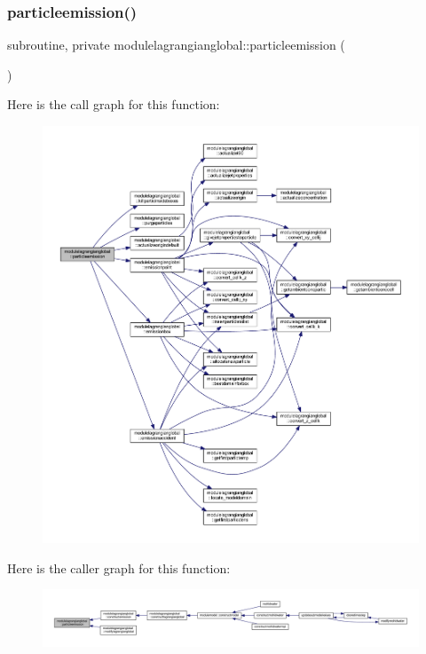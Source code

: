 \subsubsection{\texorpdfstring{particleemission()}{particleemission()}}
{\footnotesize\ttfamily subroutine, private modulelagrangianglobal\+::particleemission (\begin{DoxyParamCaption}{ }\end{DoxyParamCaption})\hspace{0.3cm}{\ttfamily [private]}}

Here is the call graph for this function\+:\nopagebreak
\begin{figure}[H]
\begin{center}
\leavevmode
\includegraphics[width=350pt]{namespacemodulelagrangianglobal_ab8435882bf5630b41c65435698454d30_cgraph}
\end{center}
\end{figure}
Here is the caller graph for this function\+:\nopagebreak
\begin{figure}[H]
\begin{center}
\leavevmode
\includegraphics[width=350pt]{namespacemodulelagrangianglobal_ab8435882bf5630b41c65435698454d30_icgraph}
\end{center}
\end{figure}
\mbox{\label{namespacemodulelagrangianglobal_af6d6a080c97a72125b4959aa01edffd8}} 
